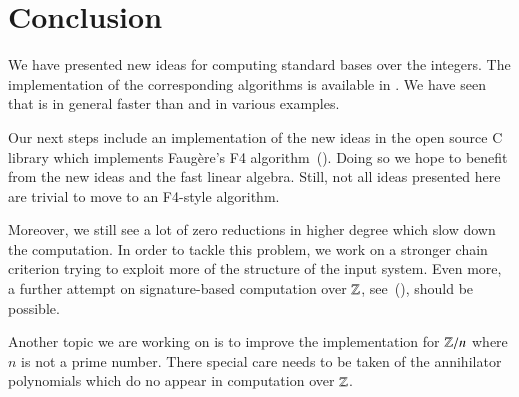 \section{Conclusion}
We have presented new ideas for computing standard bases over the integers. The
implementation of the corresponding algorithms is available in \singular. We
have seen that \singular is in general faster than \macaulay and \magma in
various examples.

Our next steps include an implementation of the new ideas in the open source C library
\gbl which implements Faug\`ere's F4 algorithm~(\cite{gbl}). Doing so we hope to
benefit from the new ideas and the fast linear algebra. Still, not all ideas
presented here are trivial to move to an F4-style algorithm.

Moreover, we still see a lot of zero reductions in higher degree which slow down
the computation. In order to tackle this problem, we work on a stronger chain
criterion trying to exploit more of the structure of the input system. Even
more, a further attempt on signature-based computation over $\mathbb{Z}$,
see~(\cite{eppSigZ2017}), should be possible.

Another topic we are working on is to improve the implementation for $\mathbb{Z}/n$
where $n$ is not a prime number. There special care needs to be taken of the
annihilator polynomials which do no appear in computation over $\mathbb{Z}$.
